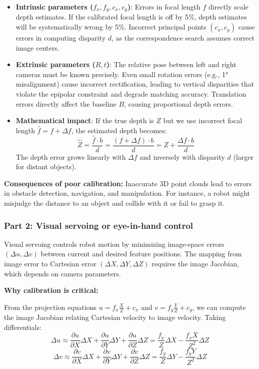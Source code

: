 \documentclass[11pt]{article}
\begin{document}
\begin{itemize}
    \item \textbf{Intrinsic parameters ($f_x, f_y, c_x, c_y$)}: Errors in focal length $f$ directly scale depth estimates. If the calibrated focal length is off by 5\%, depth estimates will be systematically wrong by 5\%. Incorrect principal points $(c_x, c_y)$ cause errors in computing disparity $d$, as the correspondence search assumes correct image centers.
    
    \item \textbf{Extrinsic parameters ($R, t$)}: The relative pose between left and right cameras must be known precisely. Even small rotation errors (e.g., 1° misalignment) cause incorrect rectification, leading to vertical disparities that violate the epipolar constraint and degrade matching accuracy. Translation errors directly affect the baseline $B$, causing proportional depth errors.
    
    \item \textbf{Mathematical impact}: If the true depth is $Z$ but we use incorrect focal length $\hat{f} = f + \Delta f$, the estimated depth becomes:
    \[
    \hat{Z} = \frac{\hat{f} \cdot b}{d} = \frac{(f + \Delta f) \cdot b}{d} = Z + \frac{\Delta f \cdot b}{d}
    \]
    The depth error grows linearly with $\Delta f$ and inversely with disparity $d$ (larger for distant objects).
\end{itemize}

\textbf{Consequences of poor calibration:} Inaccurate 3D point clouds lead to errors in obstacle detection, navigation, and manipulation. For instance, a robot might misjudge the distance to an object and collide with it or fail to grasp it.

\subsubsection*{Part 2: Visual servoing or eye-in-hand control}

Visual servoing controls robot motion by minimizing image-space errors $(\Delta u, \Delta v)$ between current and desired feature positions. The mapping from image error to Cartesian error $(\Delta X, \Delta Y, \Delta Z)$ requires the image Jacobian, which depends on camera parameters.

\textbf{Why calibration is critical:}

From the projection equations $u = f_x \frac{X}{Z} + c_x$ and $v = f_y \frac{Y}{Z} + c_y$, we can compute the image Jacobian relating Cartesian velocity to image velocity. Taking differentials:
\[
\Delta u \approx \frac{\partial u}{\partial X} \Delta X + \frac{\partial u}{\partial Y} \Delta Y + \frac{\partial u}{\partial Z} \Delta Z = \frac{f_x}{Z} \Delta X - \frac{f_x X}{Z^2} \Delta Z
\]
\[
\Delta v \approx \frac{\partial v}{\partial X} \Delta X + \frac{\partial v}{\partial Y} \Delta Y + \frac{\partial v}{\partial Z} \Delta Z = \frac{f_y}{Z} \Delta Y - \frac{f_y Y}{Z^2} \Delta Z
\]
\end{document}
